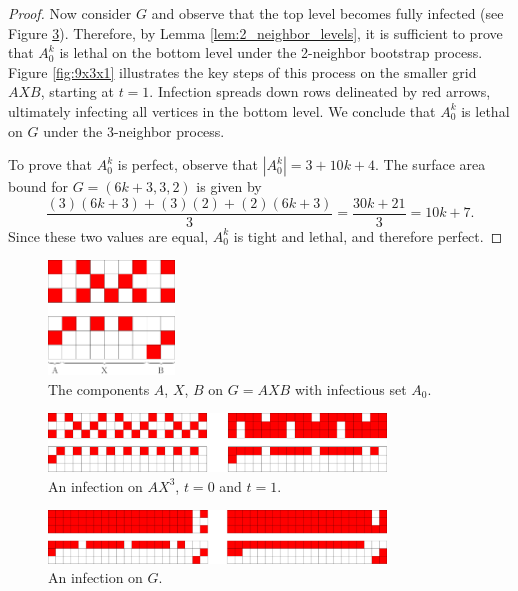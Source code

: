 \begin{proof}
Now consider $G$ and observe that the top level becomes fully infected (see Figure \ref{fig:21x3x2}). Therefore, by Lemma \ref{lem:2_neighbor_levels}, it is sufficient to prove that $A_0^k$ is lethal on the bottom level under the 2-neighbor bootstrap process. Figure \ref{fig:9x3x1} illustrates the key steps of this process on the smaller grid $AXB$, starting at $t=1$. Infection spreads down rows delineated by red arrows, ultimately infecting all vertices in the bottom level. We conclude that $A_0^k$ is lethal on $G$ under the 3-neighbor process.

To prove that $A_0^k$ is perfect, observe that $|A_0^k| = 3 + 10k + 4$. The surface area bound for $G=(6k+3,3,2)$ is given by
$$\frac{(3)(6k+3) + (3)(2) + (2)(6k+3)}{3} = \frac{30k + 21}{3} = 10k+7.$$
Since these two values are equal, $A_0^k$ is tight and lethal, and therefore perfect.
\end{proof}

\begin{figure}[]
\centering
\includegraphics[width=0.3\textwidth]{figures/7/3x9x2.pdf}
\caption{The components $A$, $X$, $B$ on $G=AXB$ with infectious set $A_0$.}
\label{fig:9x3x2}
\end{figure} 

\begin{figure}[]
\centering
\includegraphics[width=0.8\textwidth]{figures/7/3x19x2.pdf}
\caption{An infection on $AX^3$, $t=0$ and $t=1$.}
\label{fig:19x3x2}
\end{figure} 

\begin{figure}[]
\centering
\includegraphics[width=0.8\textwidth]{figures/7/3x21x2.pdf}
\caption{An infection on $G$.}
\label{fig:21x3x2}
\end{figure} 

